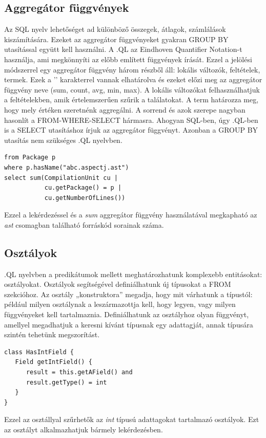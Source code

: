 \documentclass[a4paper,12pt]{report}
\begin{document}
\subsection{Aggregátor függvények}
Az SQL nyelv lehetőséget ad különböző összegek, átlagok, számlálások kiszámítására. Ezeket az aggregátor függvényeket gyakran GROUP BY utasítással együtt kell használni. A .QL az Eindhoven Quantifier Notation-t \cite{eqn_1, eqn_2} használja, ami megkönnyíti az előbb említett függvények írását. Ezzel a jelölési módszerrel egy aggregátor függvény három részből áll: lokális változók, feltételek, termek. Ezek a '\textbar' karakterrel vannak elhatárolva és ezeket előzi meg az aggregátor függvény neve (sum, count, avg, min, max). A lokális változókat felhasználhatjuk a feltételekben, amik értelemszerűen szűrik a találatokat. A term határozza meg, hogy mely értéken szeretnénk aggregálni. A sorrend és azok szerepe nagyban hasonlít a FROM-WHERE-SELECT hármasra. Ahogyan SQL-ben, úgy .QL-ben is a SELECT utasításhoz írjuk az aggregátor függvényt. Azonban a GROUP BY utasítás nem szükséges .QL nyelvben.
\begin{verbatim}
from Package p
where p.hasName("abc.aspectj.ast")
select sum(CompilationUnit cu |
           cu.getPackage() = p |
           cu.getNumberOfLines())
\end{verbatim}
Ezzel a lekérdezéssel és a \textit{sum} aggregátor függvény használatával megkapható az \textit{ast} csomagban található forráskód sorainak száma.
\subsection{Osztályok}
.QL nyelvben a predikátumok mellett meghatározhatunk komplexebb entitásokat: osztályokat. Osztályok segítségével definiálhatunk új típusokat a FROM szekcióhoz. Az osztály „konstruktora” megadja, hogy mit várhatunk a típustól: például milyen osztálynak a leszármazottja kell, hogy legyen, vagy milyen függvényeket kell tartalmaznia. Definiálhatunk az osztályhoz olyan függvényt, amellyel megadhatjuk a keresni kívánt típusnak egy adattagját, annak típusára szintén tehetünk megszorítást.
\begin{verbatim}
class HasIntField {
   Field getIntField() {
      result = this.getAField() and
      result.getType() = int
   }
}
\end{verbatim}
Ezzel az osztállyal szűrhetők az \textit{int} típusú adattagokat tartalmazó osztályok. Ezt az osztályt alkalmazhatjuk bármely lekérdezésben.
\end{document}
